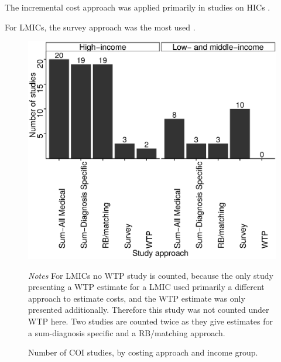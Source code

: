 The incremental cost approach was applied primarily in studies on \acp{HIC} \parencite{Smith-Spangler2012,Yang2012,Tunceli2010c,Honeycutt2009a,Pohar2007a,Ricordeau2003,Koster2011c,Koster2006c,Koster2012,Esteghamati2009,Chodick2005a,Marchesini2011b,Bruno2012,Norlund2001a,Wirehn2008b,Birnbaum2003c,Durden2009b,Rodbard2010b,Oconnell2012,Trogdon2008a,Ramsey2002a,VanderLinden2009c}.  

For \acp{LMIC}, the survey approach was the most used \parencite{Wang2009b,Wang2009f,Chan2007a,Ramachandran2007d,Javanbakht2011b,Khowaja2007a,Biorac2009a,Elrayah-Eliadarous2010b,Chatterjee2011c,Al-Maskari2010c,Druss2001,Tharkar2010a,Wang2010c}.


\begin{figure}[p]
\caption{\label{fig:review_COI_number}Number of \acs*{COI} studies, by costing approach and income group.}%

\begin{minipage}{\linewidth}
\begin{center}
\includegraphics[width=0.8\linewidth]{Review/Figures/Fig2.eps}\\
\end{center}
\footnotesize \textit{Notes} For \acp{LMIC} no \ac{WTP} study is counted, because the only study \parencite{Tharkar2010a} presenting a \ac{WTP} estimate for a \ac{LMIC} used primarily a different approach to estimate costs, and the \ac{WTP} estimate was only presented additionally. Therefore this study was not counted under \ac{WTP} here. Two studies are counted twice as they give estimates for a sum-diagnosis specific and a RB/matching approach.
\end{minipage}
\end{figure}

